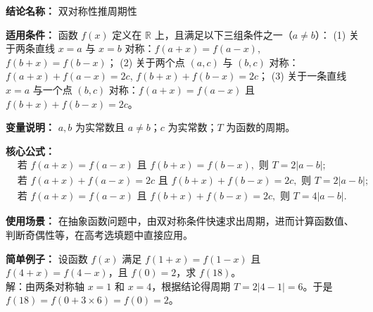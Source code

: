 \textbf{结论名称：} 双对称性推周期性

\textbf{适用条件：} 函数 \(f(x)\) 定义在 \(\mathbb{R}\) 上，且满足以下三组条件之一（\(a\neq b\)）：
(1) 关于两条直线 \(x=a\) 与 \(x=b\) 对称：\(f(a+x)=f(a-x)\), \(f(b+x)=f(b-x)\)；
(2) 关于两个点 \((a,c)\) 与 \((b,c)\) 对称：\(f(a+x)+f(a-x)=2c\), \(f(b+x)+f(b-x)=2c\)；
(3) 关于一条直线 \(x=a\) 与一个点 \((b,c)\) 对称：\(f(a+x)=f(a-x)\) 且 \(f(b+x)+f(b-x)=2c\)。

\textbf{变量说明：} \(a,b\) 为实常数且 \(a\neq b\)；\(c\) 为实常数；\(T\) 为函数的周期。

\textbf{核心公式：}
\[
\boxed{
\begin{aligned}
&\text{若 } f(a+x)=f(a-x) \text{ 且 } f(b+x)=f(b-x), \text{ 则 } T=2|a-b|;\\
&\text{若 } f(a+x)+f(a-x)=2c \text{ 且 } f(b+x)+f(b-x)=2c, \text{ 则 } T=2|a-b|;\\
&\text{若 } f(a+x)=f(a-x) \text{ 且 } f(b+x)+f(b-x)=2c, \text{ 则 } T=4|a-b|.
\end{aligned}
}
\]

\textbf{使用场景：} 在抽象函数问题中，由双对称条件快速求出周期，进而计算函数值、判断奇偶性等，在高考选填题中直接应用。

\textbf{简单例子：} 设函数 \(f(x)\) 满足 \(f(1+x)=f(1-x)\) 且 \(f(4+x)=f(4-x)\)，且 \(f(0)=2\)，求 \(f(18)\)。\\
解：由两条对称轴 \(x=1\) 和 \(x=4\)，根据结论得周期 \(T=2|4-1|=6\)。于是 \(f(18)=f(0+3\times6)=f(0)=2\)。